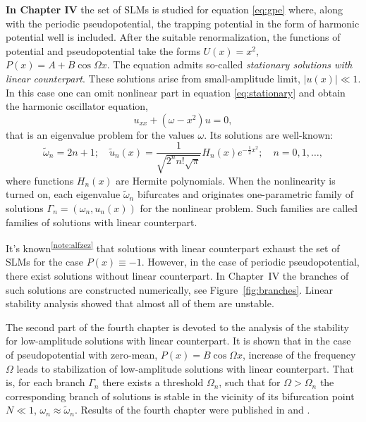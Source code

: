 \documentclass[candidate, href, colorlinks]{disser}
\begin{document}
\textbf{In Chapter IV} the set of SLMs is studied for equation \eqref{eq:gpe} where, along with the periodic pseudopotential, the trapping potential in the form of harmonic potential well is included.
After the suitable renormalization, the functions of potential and pseudopotential take the forms $U(x) = x^2$, $P(x) = A + B \cos \Omega x$.
The equation admits so-called {\it stationary solutions with linear counterpart}.
These solutions arise from small-amplitude limit, $|u(x)| \ll 1$.
In this case one can omit nonlinear part in equation \eqref{eq:stationary} and obtain the harmonic oscillator equation,
\begin{equation}
	u_{xx} + (\omega - x^2) u = 0,
\end{equation}
that is an eigenvalue problem for the values $\omega$.
Its solutions are well-known:
\begin{equation}
	\tilde{\omega}_n = 2n + 1; \quad \tilde{u}_n(x) = \dfrac{1}{\sqrt{2^n n! \sqrt{\pi}}} H_n(x) e^{-\frac{1}{2} x^2}; \quad n = 0, 1, \dots,
\label{eq:ho}
\end{equation}
where functions $H_n(x)$ are Hermite polynomials.
When the nonlinearity is turned on, each eigenvalue $\tilde{\omega}_n$ bifurcates and originates one-parametric family of solutions $\Gamma_n = (\omega_n, u_n(x))$ for the nonlinear problem.
Such families are called families of solutions with linear counterpart. 

It's known\textsuperscript{\ref{note:alfzez}} that solutions with linear counterpart exhaust the set of SLMs for the case $P(x) \equiv -1$.
However, in the case of periodic pseudopotential, there exist solutions without linear counterpart.
In Chapter~IV the branches of such solutions are constructed numerically, see Figure~\ref{fig:branches}.
Linear stability analysis showed that almost all of them are unstable.

The second part of the fourth chapter is devoted to the analysis of the stability for low-amplitude solutions with linear counterpart.
It is shown that in the case of pseudopotential with zero-mean, $P(x) = B \cos \Omega x$, increase of the frequency $\Omega$ leads to stabilization of low-amplitude solutions with linear counterpart.
That is, for each branch $\Gamma_n$ there exists a threshold $\Omega_n$, such that for $\Omega > \Omega_n$ the corresponding branch of solutions is stable in the vicinity of its bifurcation point $N \ll 1$, $\omega_n \approx \tilde{\omega}_n$.
Results of the fourth chapter were published in \cite{AlfimovGegelLebedevMalomedZezyulin} and \cite{Bannoe2018}.
\end{document}
